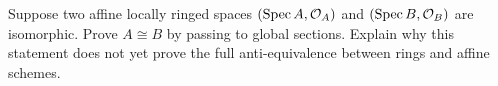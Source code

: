 \begin{problem}\label{chal:vi17-c05}
Suppose two affine locally ringed spaces $(\operatorname{Spec} A,\mathcal O_A)$ and $(\operatorname{Spec} B,\mathcal O_B)$ are isomorphic.  Prove $A\cong B$ by passing to global sections.  Explain why this statement does not yet prove the full anti-equivalence between rings and affine schemes.
\end{problem}

